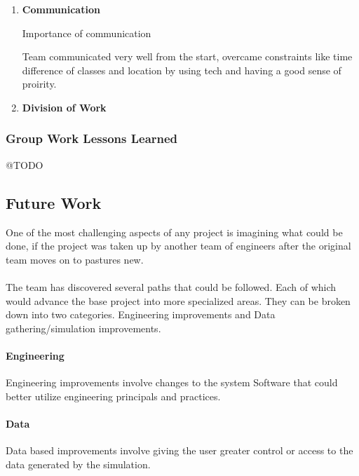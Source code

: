 \documentclass[11pt]{article}
\begin{document}
\begin{enumerate}
	
	\item \textbf{Communication}
	
	Importance of communication
	
	Team communicated very well from the start, overcame constraints like time difference of classes and location by using tech and having a good sense of proirity.
	
	\item \textbf{Division of Work}
	
	
	
	
\end{enumerate}

\subsubsection{Group Work Lessons Learned}
@TODO

\pagebreak
\subsection{Future Work} 
One of the most challenging aspects of any project is imagining what could be done, if the project was taken up by another team of engineers after the original team moves on to pastures new.
\\~\\
The team has discovered several paths that could be followed. Each of which would advance the base project into more specialized areas.
They can be broken down into two categories. Engineering improvements and Data gathering/simulation improvements.

\paragraph{Engineering}
Engineering improvements involve changes to the system Software that could better utilize engineering principals and practices.

\paragraph{Data}
Data based improvements involve giving the user greater control or access to the data generated by the simulation.\\
\end{document}
